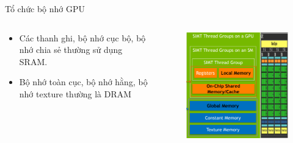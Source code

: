 \documentclass[10pt]{beamer}
\theoremstyle{remark}
\numberwithin{algocf}{section}
\numberwithin{equation}{section}
\numberwithin{dl}{section}
\numberwithin{figure}{section}
\begin{document}
\begin{frame}{Tổ chức bộ nhớ GPU}
    \begin{columns}[onlytextwidth]
        \begin{column}{0.5\linewidth}
            \begin{itemize}
                \item Các thanh ghi, bộ nhớ cục bộ, bộ nhớ chia sẻ thường sử dụng SRAM.
                \item Bộ nhớ toàn cục, bộ nhớ hằng, bộ nhớ texture thường là DRAM
            \end{itemize}
        \end{column}
        \begin{column}{0.5\linewidth}
            \begin{figure}[H]
                \centering
                \includegraphics[width=\linewidth]{figures/CUDA/GPU_Memory_Hierachy.png}
            \end{figure}
        \end{column}
    \end{columns}
\end{frame}
\end{document}
